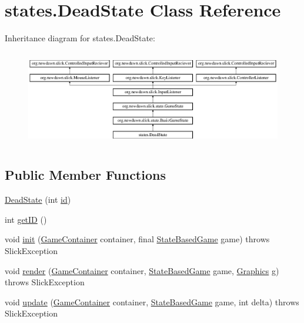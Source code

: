 \hypertarget{classstates_1_1_dead_state}{}\section{states.\+Dead\+State Class Reference}
\label{classstates_1_1_dead_state}
Inheritance diagram for states.\+Dead\+State\+:\begin{figure}[H]
\begin{center}
\leavevmode
\includegraphics[height=4.226415cm]{classstates_1_1_dead_state}
\end{center}
\end{figure}
\subsection*{Public Member Functions}
\begin{DoxyCompactItemize}
\item 
\mbox{\hyperlink{classstates_1_1_dead_state_ac19c502769593a77e120afe70c67014f}{Dead\+State}} (int \mbox{\hyperlink{classstates_1_1_dead_state_af4562c02a3bcac59678cfd1d540add79}{id}})
\item 
int \mbox{\hyperlink{classstates_1_1_dead_state_aed9ba185773a1be650305bd8c8d00a20}{get\+ID}} ()
\item 
void \mbox{\hyperlink{classstates_1_1_dead_state_a0ef2cdab84227544109b871136e629eb}{init}} (\mbox{\hyperlink{classorg_1_1newdawn_1_1slick_1_1_game_container}{Game\+Container}} container, final \mbox{\hyperlink{classorg_1_1newdawn_1_1slick_1_1state_1_1_state_based_game}{State\+Based\+Game}} game)  throws Slick\+Exception 
\item 
void \mbox{\hyperlink{classstates_1_1_dead_state_a0c76c2d5c196804e0a0362ef198c6f55}{render}} (\mbox{\hyperlink{classorg_1_1newdawn_1_1slick_1_1_game_container}{Game\+Container}} container, \mbox{\hyperlink{classorg_1_1newdawn_1_1slick_1_1state_1_1_state_based_game}{State\+Based\+Game}} game, \mbox{\hyperlink{classorg_1_1newdawn_1_1slick_1_1_graphics}{Graphics}} g)  throws Slick\+Exception 
\item 
void \mbox{\hyperlink{classstates_1_1_dead_state_ad8f7baa8e5ae45ef5673ccbdb9ee0229}{update}} (\mbox{\hyperlink{classorg_1_1newdawn_1_1slick_1_1_game_container}{Game\+Container}} container, \mbox{\hyperlink{classorg_1_1newdawn_1_1slick_1_1state_1_1_state_based_game}{State\+Based\+Game}} game, int delta)  throws Slick\+Exception 
\end{DoxyCompactItemize}
